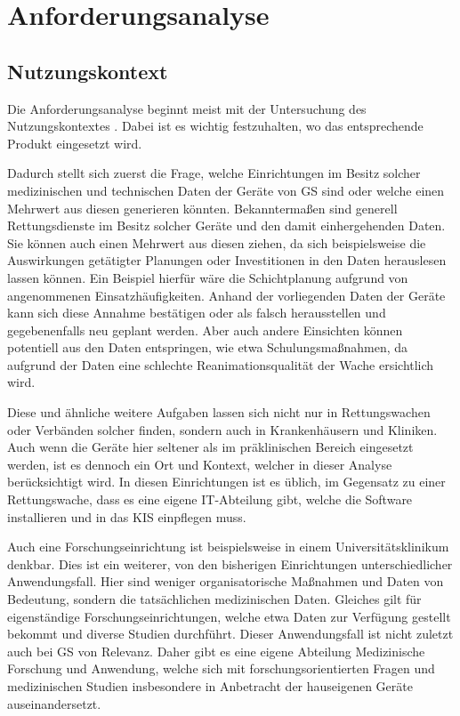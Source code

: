 \chapter{Anforderungsanalyse}
\label{kap:anforderungsanalyse}
\minitoc\pagebreak

\section{Nutzungskontext}
\label{sec:kontext}

Die Anforderungsanalyse beginnt meist mit der Untersuchung des Nutzungskontextes \cite{Bergsmann.2018}.
Dabei ist es wichtig festzuhalten, wo das entsprechende Produkt eingesetzt wird.

Dadurch stellt sich zuerst die Frage, welche Einrichtungen im Besitz solcher medizinischen und technischen Daten der Geräte von \gls{GS} sind oder welche einen Mehrwert aus diesen generieren könnten.
Bekanntermaßen sind generell Rettungsdienste im Besitz solcher Geräte und den damit einhergehenden Daten.
Sie können auch einen Mehrwert aus diesen ziehen, da sich beispielsweise die Auswirkungen getätigter Planungen oder Investitionen in den Daten herauslesen lassen können.
Ein Beispiel hierfür wäre die Schichtplanung aufgrund von angenommenen Einsatzhäufigkeiten.
Anhand der vorliegenden Daten der Geräte kann sich diese Annahme bestätigen oder als falsch herausstellen und gegebenenfalls neu geplant werden.
Aber auch andere Einsichten können potentiell aus den Daten entspringen, wie etwa Schulungsmaßnahmen, da aufgrund der Daten eine schlechte Reanimationsqualität der Wache ersichtlich wird.

Diese und ähnliche weitere Aufgaben lassen sich nicht nur in Rettungswachen oder Verbänden solcher finden, sondern auch in Krankenhäusern und Kliniken.
Auch wenn die Geräte hier seltener als im präklinischen Bereich eingesetzt werden, ist es dennoch ein Ort und Kontext, welcher in dieser Analyse berücksichtigt wird.
In diesen Einrichtungen ist es üblich, im Gegensatz zu einer Rettungswache, dass es eine eigene IT-Abteilung gibt, welche die Software installieren und in das \acrlong{KIS} einpflegen muss.

Auch eine Forschungseinrichtung ist beispielsweise in einem Universitätsklinikum denkbar.
Dies ist ein weiterer, von den bisherigen Einrichtungen unterschiedlicher Anwendungsfall.
Hier sind weniger organisatorische Maßnahmen und Daten von Bedeutung, sondern die tatsächlichen medizinischen Daten.
Gleiches gilt für eigenständige Forschungseinrichtungen, welche etwa Daten zur Verfügung gestellt bekommt und diverse Studien durchführt.
Dieser Anwendungsfall ist nicht zuletzt auch bei \gls{GS} von Relevanz.
Daher gibt es eine eigene Abteilung \glqq Medizinische Forschung und Anwendung\grqq{}, welche sich mit forschungsorientierten Fragen und medizinischen Studien insbesondere in Anbetracht der hauseigenen Geräte auseinandersetzt.

